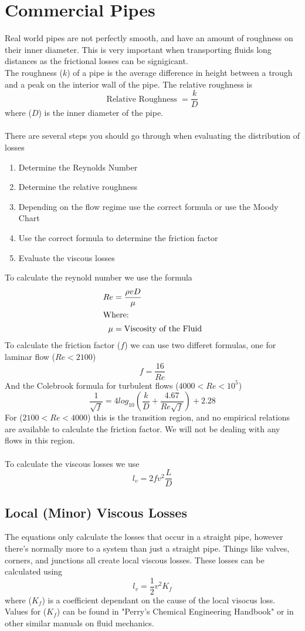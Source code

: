 \documentclass[12pt,a4paper]{article}
\begin{document}
\section{Commercial Pipes}
    Real world pipes are not perfectly smooth, and have an amount of roughness on their inner diameter. This is very important when transporting fluids long distances as the frictional losses can be signigicant. \\
    The roughness ($k$) of a pipe is the average difference in height between a trough and a peak on the interior wall of the pipe. The relative roughness is
    \[\text{Relative Roughness }=\frac{k}{D}\]
    where ($D$) is the inner diameter of the pipe. \\
    \\
    There are several steps you should go through when evaluating the distribution of losses
    \begin{enumerate}
        \item Determine the Reynolds Number 
        \item Determine the relative roughness
        \item Depending on the flow regime use the correct formula or use the Moody Chart
        \item Use the correct formula to determine the friction factor
        \item Evaluate the viscous losses \\
    \end{enumerate} 

    \noindent To calculate the reynold number we use the formula
    \begin{align}
        Re&=\frac{\rho v D}{\mu} \\
        \intertext{Where: }
        \mu &=\text{Viscosity of the Fluid} \nonumber
    \end{align}
    To calculate the friction factor ($f$) we can use two differet formulas, one for laminar flow ($Re<2100$)
    \[f=\frac{16}{Re}\]
    And the Colebrook formula for turbulent flows ($4000<Re<10^5$)
    \[\frac{1}{\sqrt{f}}=4log_{10}\left(\frac{k}{D}+\frac{4.67}{Re\sqrt{f}}\right)+2.28\]
    For ($2100<Re<4000$) this is the transition region, and no empirical relations are available to calculate the friction factor. We will not be dealing with any flows in this region. \\
    \\
    To calculate the  viscous losses we use 
    \[l_v=2fv^2\frac{L}{D}\]

    \subsection{Local (Minor) Viscous Losses}
        The equations only calculate the losses that occur in a straight pipe, however there's normally more to a system than just a straight pipe. Things like valves, corners, and junctions all create local viscous losses. These losses can be calculated using
        \[l_v=\frac{1}{2}v^2K_f\]
        where ($K_f$) is a coefficient dependant on the cause of the local visocus loss. Values for ($K_f$) can be found in "Perry's Chemical Engineering Handbook" or in other similar manuals on fluid mechanics.
\end{document}

